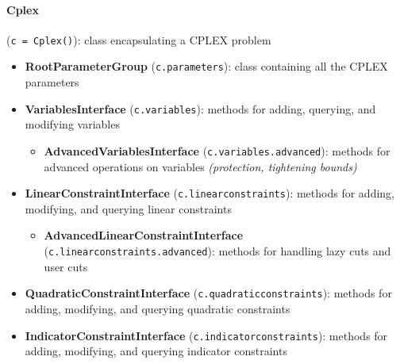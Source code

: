 \documentclass[12pt]{article}
\begin{document}
\paragraph{Cplex} (\texttt{c = Cplex()}): class encapsulating a CPLEX problem
\begin{itemize}
    \item \textbf{RootParameterGroup} (\texttt{c.parameters}): class containing all the CPLEX parameters
    \item \textbf{VariablesInterface} (\texttt{c.variables}): methods for adding, querying, and modifying variables
        \begin{itemize}
            \item \textbf{AdvancedVariablesInterface} (\texttt{c.variables.advanced}): methods for advanced operations on variables \emph{(protection, tightening bounds)}
        \end{itemize}
    \item \textbf{LinearConstraintInterface} (\texttt{c.linear\ttul constraints}): methods for adding, modifying, and querying linear constraints
        \begin{itemize}
            \item \textbf{AdvancedLinearConstraintInterface} (\texttt{c.linear\ttul constraints.advanced}): methods for handling lazy cuts and user cuts
        \end{itemize}
    \item \textbf{QuadraticConstraintInterface} (\texttt{c.quadratic\ttul constraints}): methods for adding, modifying, and querying quadratic constraints
    \item \textbf{IndicatorConstraintInterface} (\texttt{c.indicator\ttul constraints}): methods for adding, modifying, and querying indicator constraints

\end{itemize}
\end{document}
